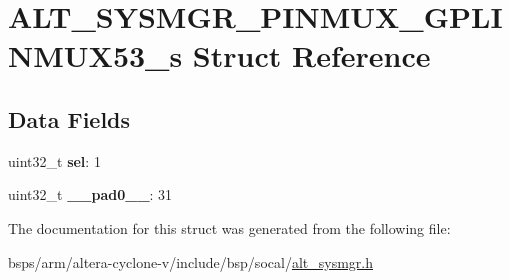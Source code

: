 \hypertarget{structALT__SYSMGR__PINMUX__GPLINMUX53__s}{}\section{A\+L\+T\+\_\+\+S\+Y\+S\+M\+G\+R\+\_\+\+P\+I\+N\+M\+U\+X\+\_\+\+G\+P\+L\+I\+N\+M\+U\+X53\+\_\+s Struct Reference}
\label{structALT__SYSMGR__PINMUX__GPLINMUX53__s}
\subsection*{Data Fields}
\begin{DoxyCompactItemize}
\item 
\mbox{\label{structALT__SYSMGR__PINMUX__GPLINMUX53__s_aeb9ee02a16c1e8c73ce6a1c786aa9555}} 
uint32\+\_\+t {\bfseries sel}\+: 1
\item 
\mbox{\label{structALT__SYSMGR__PINMUX__GPLINMUX53__s_ac82155acf9b6729e3c8a22fc2de1950e}} 
uint32\+\_\+t {\bfseries \+\_\+\+\_\+pad0\+\_\+\+\_\+}\+: 31
\end{DoxyCompactItemize}


The documentation for this struct was generated from the following file\+:\begin{DoxyCompactItemize}
\item 
bsps/arm/altera-\/cyclone-\/v/include/bsp/socal/\mbox{\hyperlink{alt__sysmgr_8h}{alt\+\_\+sysmgr.\+h}}\end{DoxyCompactItemize}
